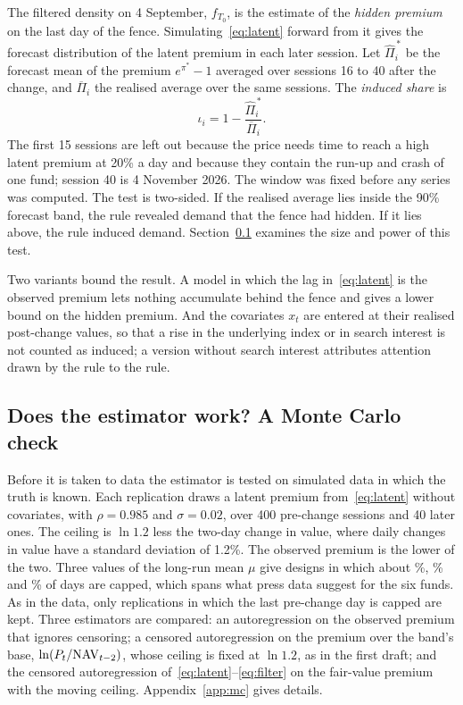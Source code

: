 The filtered density on 4 September, $f_{T_0}$, is the estimate of the \emph{hidden premium} on the last day of the fence. Simulating~\eqref{eq:latent} forward from it gives the forecast distribution of the latent premium in each later session. Let $\widehat{\Pi}^{\,*}_{i}$ be the forecast mean of the premium $e^{\pi^{*}}-1$ averaged over sessions 16 to 40 after the change, and $\overline{\Pi}_{i}$ the realised average over the same sessions. The \emph{induced share} is
\begin{equation}\label{eq:iota}
\iota_i=1-\frac{\widehat{\Pi}^{\,*}_{i}}{\overline{\Pi}_{i}}.
\end{equation}
The first 15 sessions are left out because the price needs time to reach a high latent premium at 20\% a day and because they contain the run-up and crash of one fund; session 40 is 4 November 2026. The window was fixed before any series was computed. The test is two-sided. If the realised average lies inside the 90\% forecast band, the rule revealed demand that the fence had hidden. If it lies above, the rule induced demand. Section~\ref{sec:mc} examines the size and power of this test.

Two variants bound the result. A model in which the lag in~\eqref{eq:latent} is the observed premium lets nothing accumulate behind the fence and gives a lower bound on the hidden premium. And the covariates $x_t$ are entered at their realised post-change values, so that a rise in the underlying index or in search interest is not counted as induced; a version without search interest attributes attention drawn by the rule to the rule.

\subsection{Does the estimator work? A Monte Carlo check}\label{sec:mc}
Before it is taken to data the estimator is tested on simulated data in which the truth is known. Each replication draws a latent premium from~\eqref{eq:latent} without covariates, with $\rho=0.985$ and $\sigma=0.02$, over 400 pre-change sessions and 40 later ones. The ceiling is $\ln 1.2$ less the two-day change in value, where daily changes in value have a standard deviation of 1.2\%. The observed premium is the lower of the two. Three values of the long-run mean $\mu$ give designs in which about \mcShareA\%, \mcShareB\% and \mcShareC\% of days are capped, which spans what press data suggest for the six funds. As in the data, only replications in which the last pre-change day is capped are kept. Three estimators are compared: an autoregression on the observed premium that ignores censoring; a censored autoregression on the premium over the band's base, $\ln(P_t/\mathrm{NAV}_{t-2})$, whose ceiling is fixed at $\ln 1.2$, as in the first draft; and the censored autoregression of~\eqref{eq:latent}--\eqref{eq:filter} on the fair-value premium with the moving ceiling. Appendix~\ref{app:mc} gives details.

